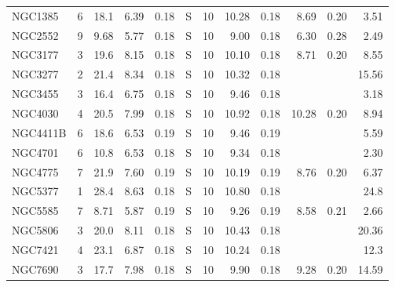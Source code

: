 \begin{tabular}{lrrrrrrrrrrr}
NGC1385  &  6 & 18.1  & 6.39 & 0.18  & S  & 10  & 10.28 & 0.18  & 8.69 & 0.20 & 3.51  \\
NGC2552  &  9 & 9.68  & 5.77 & 0.18  & S  & 10  & 9.00 & 0.18  & 6.30 & 0.28 & 2.49 \\
NGC3177  &  3 & 19.6  & 8.15 & 0.18  & S  & 10  & 10.10 & 0.18  & 8.71 & 0.20 & 8.55  \\
NGC3277  &  2 & 21.4  & 8.34 & 0.18  & S  & 10  & 10.32 & 0.18  & & & 15.56  \\
NGC3455  &  3 & 16.4  & 6.75 & 0.18  & S  & 10  & 9.46 & 0.18  & & & 3.18  \\
NGC4030  &  4 & 20.5  & 7.99 & 0.18  & S  & 10  & 10.92 & 0.18  & 10.28 & 0.20 & 8.94   \\
NGC4411B  &  6 & 18.6  & 6.53 & 0.19  & S  & 10  & 9.46 & 0.19  & & & 5.59  \\
NGC4701  &  6 & 10.8  & 6.53 & 0.18  & S  & 10  & 9.34 & 0.18  & & & 2.30  \\
NGC4775  &  7 & 21.9  & 7.60 & 0.19  & S  & 10  & 10.19 & 0.19  & 8.76 & 0.20 & 6.37 \\
NGC5377  &  1 & 28.4  & 8.63 & 0.18  & S  & 10  & 10.80 & 0.18  & & & 24.8  \\
NGC5585  &  7 & 8.71  & 5.87 & 0.19  & S  & 10  & 9.26 & 0.19  & 8.58 & 0.21 & 2.66  \\
NGC5806  &  3 & 20.0  & 8.11 & 0.18  & S  & 10  & 10.43 & 0.18  & & & 20.36  \\
NGC7421  &  4 & 23.1  & 6.87 & 0.18  & S  & 10  & 10.24 & 0.18  & & & 12.3  \\
NGC7690  &  3 & 17.7  & 7.98 & 0.18  & S  & 10  & 9.90 & 0.18  & 9.28 & 0.20 & 14.59  \\
\end{tabular}
